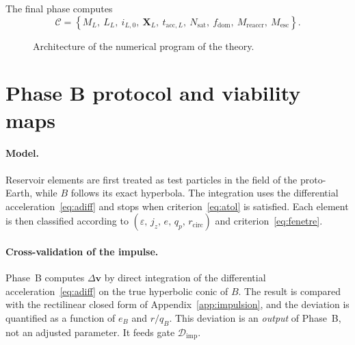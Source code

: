 \documentclass[11pt,a4paper,openany]{report}
\begin{document}
The final phase computes
\begin{equation}
\mathcal{C}=\left\{M_L,\ L_L,\ i_{L,0},\ \mathbf{X}_L,\ t_{\mathrm{acc},L},\ N_{\mathrm{sat}},\
f_{\mathrm{dom}},\ M_{\mathrm{reaccr}},\ M_{\mathrm{esc}}\right\}.
\label{eq:phaseC}
\end{equation}

\begin{figure}[htbp]
\centering
{}
\caption{Architecture of the numerical program of the theory.}
\label{fig:programme}
\end{figure}

\section{Phase B protocol and viability maps}

\paragraph{Model.}
Reservoir elements are first treated as test particles in the field of the proto-Earth, while $B$
follows its exact hyperbola. The integration uses the differential acceleration~\eqref{eq:adiff}
and stops when criterion~\eqref{eq:atol} is satisfied. Each element is then classified according to
$(\varepsilon,\,j_z,\,e,\,q_p,\,r_{\mathrm{circ}})$ and criterion~\eqref{eq:fenetre}.

\paragraph{Cross-validation of the impulse.}
Phase~B computes $\Delta\mathbf{v}$ by direct integration of the differential
acceleration~\eqref{eq:adiff} on the true hyperbolic conic of $B$. The result is compared with the
rectilinear closed form of Appendix~\ref{app:impulsion}, and the deviation is quantified as a
function of $e_B$ and $r/q_B$. This deviation is an \emph{output} of Phase~B, not an adjusted
parameter. It feeds gate $\mathcal{D}_{\mathrm{imp}}$.
\end{document}
